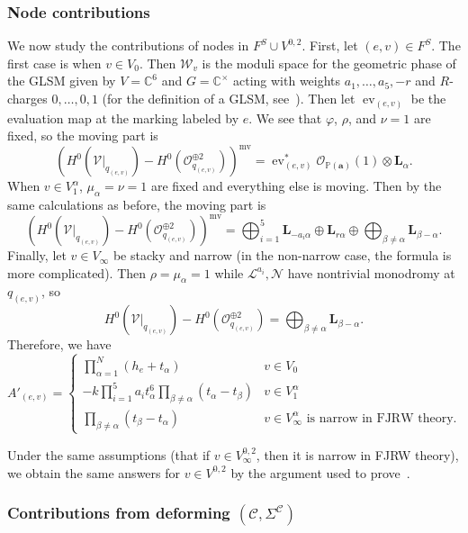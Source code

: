 \documentclass{amsart}
\theoremstyle{definition}
\theoremstyle{remark}
\theoremstyle{plain}
\theoremstyle{definition}
\theoremstyle{remark}
\newcommand{\C}{\mathbb{C}}
\renewcommand{\P}{\mathbb{P}}
\newcommand{\ba}{\mathbf{a}}
\newcommand{\mc}[1]{\mathcal{#1}}
\newcommand{\mbf}[1]{\mathbf{#1}}
\newcommand{\mr}[1]{\mathrm{#1}}
\newcommand{\on}[1]{\operatorname{#1}}
\newcommand{\1}{\mathbf{1}}
\newcommand{\2}{\mathbf{2}}
\newcommand{\3}{\mathbf{3}}
\newcommand{\mv}{\mr{mv}}
\begin{document}
\subsubsection{Node contributions}%
\label{ssub:Node contributions}

We now study the contributions of nodes in $F^S \cup V^{0,2}$. First, let $(e,v) \in F^S$. The first case is when $v \in V_0$. Then $\mc{W}_v$ is the moduli space for the geometric phase of the GLSM given by $V = \C^6$ and $G = \C^{\times}$ acting with weights $a_1, \ldots, a_5, -r$ and $R$-charges $0,\ldots,0,1$ (for the definition of a GLSM, see~\cite{glsm}). Then let $\on{ev}_{(e,v)}$ be the evaluation map at the marking labeled by $e$. We see that $\varphi$, $\rho$, and $\nu=1$ are fixed, so the moving part is
\[ (H^0(\mc{V}|_{q_{(e,v)}}) - H^0(\mc{O}_{q_{(e,v)}}^{\oplus 2}))^{\mv} = \on{ev}_{(e,v)}^* \mc{O}_{\P(\ba)}(1) \otimes \mbf{L}_{\alpha}. \]
When $v \in V_1^{\alpha}$, $\mu_{\alpha} = \nu = 1$ are fixed and everything else is moving. Then by the same calculations as before, the moving part is
\[ (H^0(\mc{V}|_{q_{(e,v)}}) - H^0(\mc{O}_{q_{(e,v)}}^{\oplus 2}))^{\mv} = \bigoplus_{i=1}^5 \mbf{L}_{-a_i \alpha} \oplus \mbf{L}_{r \alpha} \oplus \bigoplus_{\beta \neq \alpha} \mbf{L}_{\beta-\alpha}. \]
Finally, let $v \in V_{\infty}$ be stacky and narrow (in the non-narrow case, the formula is more complicated). Then $\rho = \mu_{\alpha}=1$ while $\mc{L}^{a_i}, \mc{N}$ have nontrivial monodromy at $q_{(e,v)}$, so 
\[ H^0(\mc{V}|_{q_{(e,v)}}) - H^0(\mc{O}_{q_{(e,v)}}^{\oplus 2}) = \bigoplus_{\beta \neq \alpha} \mbf{L}_{\beta - \alpha}. \]
Therefore, we have
\[ A'_{(e,v)} = \begin{cases}
    \prod_{\alpha=1}^N (h_e + t_{\alpha}) & v \in V_0 \\
    - k \prod_{i=1}^5 a_i t_{\alpha}^6 \prod_{\beta \neq \alpha} (t_{\alpha} - t_{\beta}) & v \in V_1^{\alpha} \\
    \prod_{\beta \neq \alpha} (t_{\beta} - t_{\alpha}) & v \in V_{\infty}^{\alpha} \text{ is narrow in FJRW theory}.
\end{cases}
\]

Under the same assumptions (that if $v \in V_{\infty}^{0,2}$, then it is narrow in FJRW theory), we obtain the same answers for $v \in V^{0,2}$ by the argument used to prove~\cite[Lemma 4.8]{msp2}.

\subsubsection{Contributions from deforming $(\mc{C}, \Sigma^{\mc{C}})$}%
\end{document}
